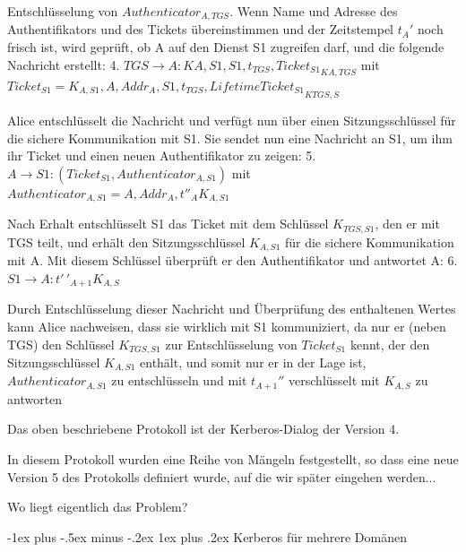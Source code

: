 \documentclass[a4paper]{article}
\makeatletter
\renewcommand{\subsubsection}{\@startsection{subsubsection}{3}{0mm}%
 {-1ex plus -.5ex minus -.2ex}%
 {1ex plus .2ex}%
 {\normalfont\small\bfseries}}
\makeatother
\begin{document}
\begin{multicols}{3}
\begin{itemize*}
            Entschlüsselung von $Authenticator_{A,TGS}$. Wenn Name und
            Adresse des Authentifikators und des Tickets übereinstimmen und der
            Zeitstempel $t_A'$ noch frisch ist, wird geprüft, ob A auf den
            Dienst S1 zugreifen darf, und die folgende Nachricht erstellt: 4.
            $TGS\rightarrow A:{{K}{A,S1}, S1, t_{TGS}, Ticket_{S1}}_{{K}{A,TGS}}$ mit $Ticket_{S1}={K_{A,S1}, A, Addr_A, S1, t_{TGS}, LifetimeTicket_{S1}}_{{K}{TGS,S}}$
            \item Alice entschlüsselt die Nachricht und verfügt nun über einen
            Sitzungsschlüssel für die sichere Kommunikation mit S1. Sie sendet nun
            eine Nachricht an S1, um ihm ihr Ticket und einen neuen
            Authentifikator zu zeigen: 5. $A\rightarrow
                  S1:(Ticket_{S1}, Authenticator_{A,S1})$ mit
            $Authenticator_{A,S1}={A,Addr_A, t''_{A}}{K_{A,S1}}$
            \item Nach Erhalt entschlüsselt S1 das Ticket mit dem Schlüssel
            $K_{TGS,S1}$, den er mit TGS teilt, und erhält den
            Sitzungsschlüssel $K_{A,S1}$ für die sichere Kommunikation mit A.
            Mit diesem Schlüssel überprüft er den Authentifikator und antwortet A:
            6. $S1\rightarrow A:{t'\,'_{A+1}}{K_{A,S}}$
            \item Durch Entschlüsselung dieser Nachricht und Überprüfung des enthaltenen
            Wertes kann Alice nachweisen, dass sie wirklich mit S1 kommuniziert,
            da nur er (neben TGS) den Schlüssel $K_{TGS,S1}$ zur
            Entschlüsselung von $Ticket_{S1}$ kennt, der den
            Sitzungsschlüssel $K_{A,S1}$ enthält, und somit nur er in der
            Lage ist, $Authenticator_{A,S1}$ zu entschlüsseln und mit $t_{A+1}''$ verschlüsselt mit $K_{A,S}$ zu antworten
            \item Das oben beschriebene Protokoll ist der Kerberos-Dialog der Version 4.
            \begin{itemize*}
                  \item In diesem Protokoll wurden eine Reihe von Mängeln festgestellt, so dass eine neue Version 5 des Protokolls definiert wurde, auf die wir später eingehen werden...
                  \item Wo liegt eigentlich das Problem?
            \end{itemize*}
      \end{itemize*}


      \subsubsection{Kerberos für mehrere
            Domänen}


\end{multicols}
\end{document}
